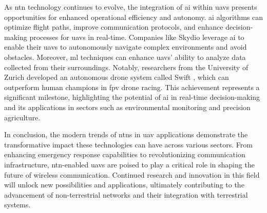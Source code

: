 As \gls{ntn} technology continues to evolve, the integration of \gls{ai} within \glspl{uav} presents opportunities for enhanced operational efficiency and autonomy. \gls{ai} algorithms can optimize flight paths, improve communication protocols, and enhance decision-making processes for \glspl{uav} in real-time. Companies like Skydio \autocite{skydioSkydioAutonomous} leverage \gls{ai} to enable their \glspl{uav} to autonomously navigate complex environments and avoid obstacles. Moreover, \gls{ml} techniques can enhance \glspl{uav}' ability to analyze data collected from their surroundings. Notably, researchers from the University of Zurich developed an autonomous drone system called Swift \autocite{Kaufmann2023ChampionlevelDR}, which can outperform human champions in \gls{fpv} drone racing. This achievement represents a significant milestone, highlighting the potential of \gls{ai} in real-time decision-making and its applications in sectors such as environmental monitoring and precision agriculture.

In conclusion, the modern trends of \glspl{ntn} in \gls{uav} applications demonstrate the transformative impact these technologies can have across various sectors. From enhancing emergency response capabilities to revolutionizing communication infrastructure, \gls{ntn}-enabled \glspl{uav} are poised to play a critical role in shaping the future of wireless communication. Continued research and innovation in this field will unlock new possibilities and applications, ultimately contributing to the advancement of non-terrestrial networks and their integration with terrestrial systems.
